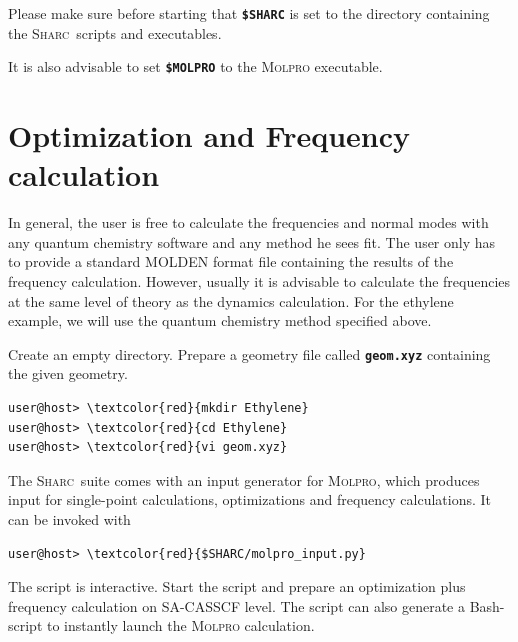 \documentclass[a4paper,11pt,DIV=15,openany]{scrbook}
\newcommand{\sharc}{\textsc{Sharc}}
\newcommand{\ttt}[1]{\textbf{\texttt{#1}}}
\begin{document}
\begin{shaded}
  Please make sure before starting that \ttt{\$SHARC} is set to the directory containing the \sharc\ scripts and executables.

  It is also advisable to set \ttt{\$MOLPRO} to the \textsc{Molpro} executable.
\end{shaded}




\section{Optimization and Frequency calculation}

In general, the user is free to calculate the frequencies and normal modes with any quantum chemistry software and any method he sees fit. The user only has to provide a standard MOLDEN format file containing the results of the frequency calculation. However, usually it is advisable to calculate the frequencies at the same level of theory as the dynamics calculation. For the ethylene example, we will use the quantum chemistry method specified above. 

Create an empty directory. Prepare a geometry file called \ttt{geom.xyz} containing the given geometry.
\begin{Verbatim}[commandchars=\\\{\}]
user@host> \textcolor{red}{mkdir Ethylene}
user@host> \textcolor{red}{cd Ethylene}
user@host> \textcolor{red}{vi geom.xyz}
\end{Verbatim}

The \sharc\ suite comes with an input generator for \textsc{Molpro}, which produces input for single-point calculations, optimizations and frequency calculations. It can be invoked with
\begin{Verbatim}[commandchars=\\\{\}]
user@host> \textcolor{red}{$SHARC/molpro_input.py}
\end{Verbatim}
The script is interactive. Start the script and prepare an optimization plus frequency calculation on SA-CASSCF level. The script can also generate a Bash-script to instantly launch the \textsc{Molpro} calculation.
\end{document}
